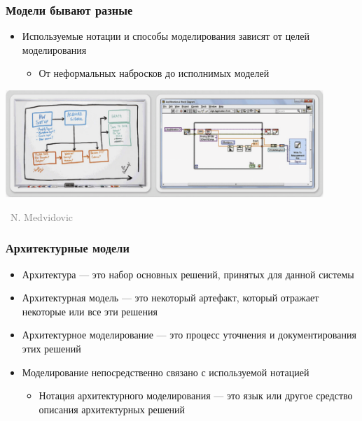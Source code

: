 \documentclass[xetex,mathserif,serif]{beamer}
\newcommand{\attribution}[1] {
	\vspace{-5mm}\begin{flushright}\begin{scriptsize}\textcolor{gray}{\textcopyright\, #1}\end{scriptsize}\end{flushright}
}
\begin{document}
	\begin{frame}
		\frametitle{Модели бывают разные}
		\begin{itemize}
			\item Используемые нотации и способы моделирования зависят от целей моделирования
			\begin{itemize}
				\item От неформальных набросков до исполнимых моделей
			\end{itemize}
		\end{itemize}
		\begin{center}
			\includegraphics[width=0.9\textwidth]{sketchesVsFormalNotations.png}
			\attribution{N. Medvidovic}
		\end{center}
	\end{frame}

	\begin{frame}
		\frametitle{Архитектурные модели}
		\begin{itemize}
			\item Архитектура --- это набор основных решений, принятых для данной системы
			\item Архитектурная модель --- это некоторый артефакт, который отражает некоторые или все эти решения
			\item Архитектурное моделирование --- это процесс уточнения и документирования этих решений
			\item Моделирование непосредственно связано с используемой нотацией
			\begin{itemize}
				\item Нотация архитектурного моделирования --- это язык или другое средство описания архитектурных решений
			\end{itemize}
		\end{itemize}
	\end{frame}
\end{document}
